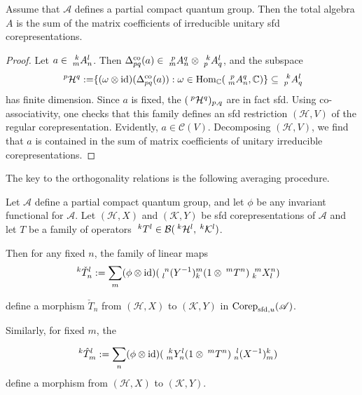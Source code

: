 \begin{Prop} \label{prop:rep-weak-pw}
  Assume that $\mathscr{A}$ defines a partial compact quantum group. Then the total algebra $A$ is the sum of the matrix coefficients of
 irreducible unitary sfd corepresentations.
\end{Prop}
\begin{proof}
  Let $a \in \Gr{A}{k}{l}{m}{n}$. Then
  $\Delta^{\co}_{pq}(a) \in
  \Gr{A}{p}{q}{m}{n} \otimes \Gr{A}{k}{l}{p}{q}$, and the subspace
    \begin{align*}
    \Gru{\mathcal{H}}{p}{q} &:= \span \{ (\omega \otimes \id)(
    \Delta^{\co}_{pq}(a)) : \omega \in \Hom_{\C}(\Gr{A}{p}{q}{m}{n},\C) \} \subseteq
    \Gr{A}{k}{l}{p}{q}
  \end{align*}
  has finite dimension. Since $a$ is fixed, the
  $(\Gru{\mathcal{H}}{p}{q})_{p,q}$ are in fact sfd. Using
  co-associativity, one checks that this family defines an sfd restriction $(\mathcal{H},V)$ of the regular
  corepresentation. Evidently, $a \in \mathcal{C}(V)$. Decomposing
  $(\mathcal{H},V)$, we find that
  $a$ is contained in the sum of matrix coefficients of unitary
  irreducible corepresentations.
\end{proof}
The key to the orthogonality relations is the following averaging procedure.
\begin{Lem} \label{lem:rep-average}
  Let $\mathscr{A}$ define a partial compact quantum group, and let  $\phi$ be any invariant functional for $\mathscr{A}$. Let
  $(\mathcal{H},X)$ and $(\mathcal{K},Y)$ be sfd corepresentations of $\mathscr{A}$ and let $T$ be
  a family of operators $\Gru{T}{k}{l} \in
  \mathcal{B}(\Gru{\mathcal{H}}{k}{l},\Gru{\mathcal{K}}{k}{l})$.
  
  Then for any fixed $n$, the family of linear maps
  \begin{align*}
    \Gru{\check T_n}{k}{l} &:= \sum_{m} (\phi \otimes
    \id)(\Gr{(Y^{-1})}{n}{m}{l}{k}(1\otimes
    \Gru{T}{m}{n})\Gr{X}{m}{n}{k}{l})
   \end{align*} 
   
  define a morphism $\check T_n$ from $(\mathcal{H},X)$ to $(\mathcal{K},Y)$ in $\Corep_{\sfd,u}(\mathscr{A})$.

     Similarly, for fixed $m$, the      
    
  \begin{align*} \Gru{\hat T_m}{k}{l} &:= \sum_{n} (\phi \otimes
    \id)(\Gr{Y}{k}{l}{m}{n}(1\otimes
    \Gru{T}{m}{n})\Gr{(X^{-1})}{l}{k}{n}{m})
  \end{align*}
  define a morphism from $(\mathcal{H},X)$ to $(\mathcal{K},Y)$. %
\end{Lem} 
